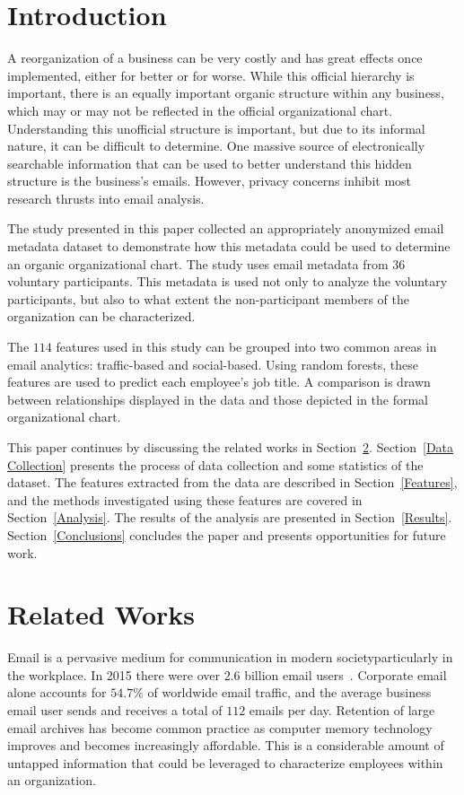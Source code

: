 \documentclass[10pt,twocolumn,conference]{IEEEtran}
\begin{document}
\section{Introduction}
A reorganization of a business can be very costly and has great effects once implemented, either for better or for worse.
While this official hierarchy is important, there is an equally important organic structure within any business, which may or may not be reflected in the official organizational chart.
Understanding this unofficial structure is important, but due to its informal nature, it can be difficult to determine.
One massive source of electronically searchable information that can be used to better understand this hidden structure is the business's emails.
However, privacy concerns inhibit most research thrusts into email analysis.  

The study presented in this paper collected an appropriately anonymized email metadata dataset to demonstrate how this metadata could be used to determine an organic organizational chart.
The study uses email metadata from $36$ voluntary participants.
This metadata is used not only to analyze the voluntary participants, but also to what extent the non-participant members of the organization can be characterized.

The $114$ features used in this study can be grouped into two common areas in email analytics: traffic-based and social-based.
Using random forests, these features are used to predict each employee's job title.
A comparison is drawn between relationships displayed in the data and those depicted in the formal organizational chart.  

This paper continues by discussing the related works in Section~\ref{Related Works}.
Section~\ref{Data Collection} presents the process of data collection and some statistics of the dataset.
The features extracted from the data are described in Section~\ref{Features}, and the methods investigated using these features are covered in Section~\ref{Analysis}.
The results of the analysis are presented in Section~\ref{Results}.
Section~\ref{Conclusions} concludes the paper and presents opportunities for future work.  

\section{Related Works} \label{Related Works}

Email is a pervasive medium for communication in modern society\textemdash{}particularly in the workplace.
In 2015 there were over $2.6$ billion email users~\cite{radicati_emails_2015}.
Corporate email alone accounts for $54.7\%$ of worldwide email traffic, and the average business email user sends and receives a total of $112$ emails per day.
Retention of large email archives has become common practice as computer memory technology improves and becomes increasingly affordable.
This is a considerable amount of untapped information that could be leveraged to characterize employees within an organization.
\end{document}
